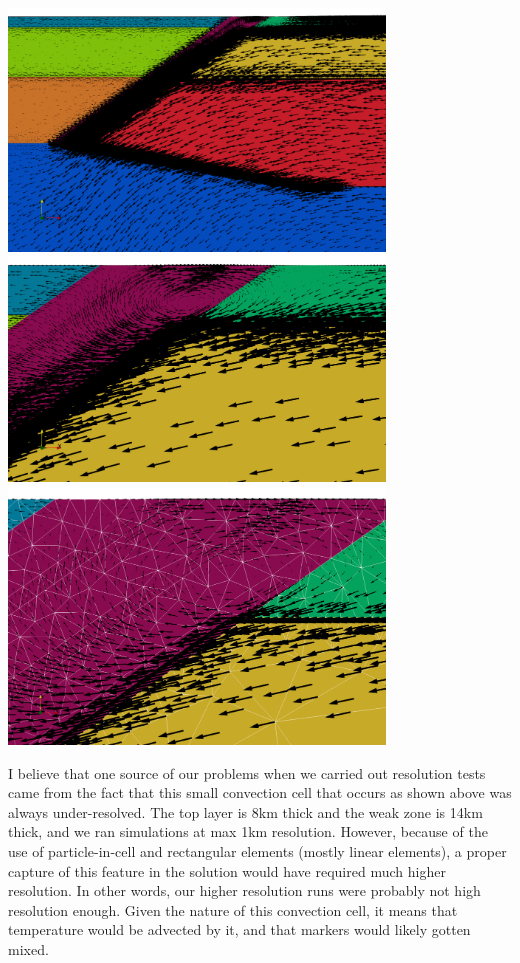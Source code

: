 \newpage
\begin{center}
\includegraphics[width=10cm]{python_codes/fieldstone_62/results/vel2}\\
\includegraphics[width=10cm]{python_codes/fieldstone_62/results/vel3}\\
\includegraphics[width=10cm]{python_codes/fieldstone_62/results/vel4}
\end{center}

I believe that one source of our problems when we carried out resolution tests
came from the fact that this small convection cell that occurs as shown above was
always under-resolved. The top layer is 8km thick and the weak zone is 14km thick,
and we ran simulations at max 1km resolution. However, because of the use  
of particle-in-cell and rectangular elements (mostly linear elements), 
a proper capture of this feature in the solution would have required much higher 
resolution. In other words, our higher resolution runs were probably not high resolution enough.
Given the nature of this convection cell, it means that temperature would be advected by it, 
and that markers would likely gotten mixed. 


